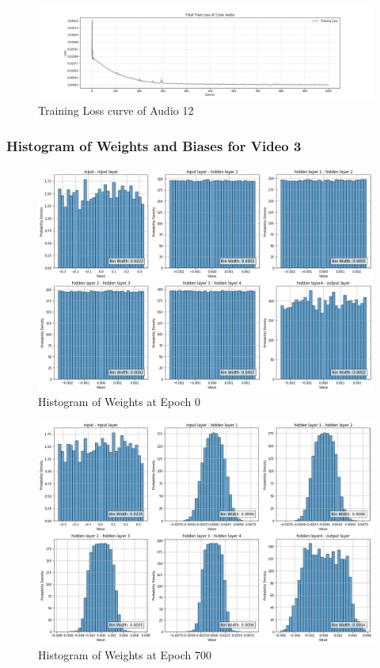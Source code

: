 \documentclass{ioereport}
\begin{document}
    \begin{figure}[H]
        \centering
        \includegraphics[width=\linewidth]{assets/audio_results/loss_curve/training_loss_curve_12.png}
        \caption{Training Loss curve of Audio 12}
        \label{fig:loss-curve-12}
    \end{figure}


\subsubsection{Histogram of Weights and Biases for Video 3}


    \begin{figure}[H]
        \centering
        \includegraphics[width=\linewidth]{assets/video histogram/epoch0Weight.png}
        \caption{Histogram of Weights at Epoch 0}
        \label{fig:video-weight-0}
    \end{figure}

    \begin{figure}[H]
        \centering
        \includegraphics[width=\linewidth]{assets/video histogram/epoch700Weight.png}
        \caption{Histogram of Weights at Epoch 700}
        \label{fig:video-weight-700}
    \end{figure}
\end{document}
